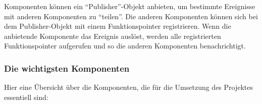 		Komponenten können ein \enquote{Publisher}-Objekt anbieten, um bestimmte Ereignisse mit anderen Komponenten zu \enquote{teilen}. Die anderen Komponenten können sich bei dem Publisher-Objekt mit einem Funktionspointer registrieren. Wenn die anbietende Komponente das Ereignis auslöst, werden alle registrierten Funktionspointer aufgerufen und so die anderen Komponenten benachrichtigt.
		

		\subsubsection{Die wichtigsten Komponenten}

		Hier eine Übersicht über die Komponenten, die für die Umsetzung des Projektes essentiell sind:

